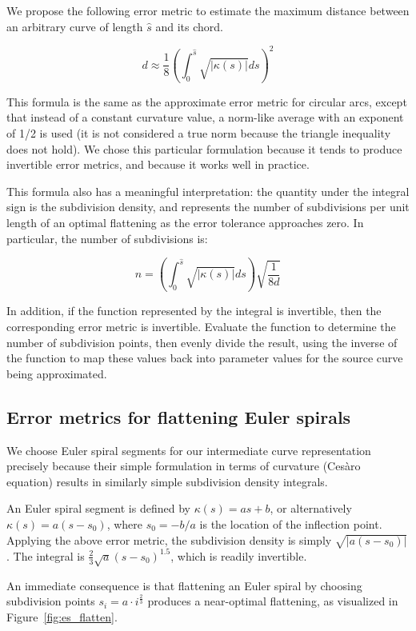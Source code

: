 \documentclass[sigconf, authordraft]{acmart}
\begin{document}
We propose the following error metric to estimate the maximum distance between an arbitrary curve of length $\hat{s}$ and its chord. 

\[
    d \approx \frac{1}{8}\left(\int_0^{\hat{s}} \sqrt{|\kappa(s)|}ds \right)^2
\]


This formula is the same as the approximate error metric for circular arcs, except that instead of a constant curvature value, a norm-like average with an exponent of 1/2 is used (it is not considered a true norm because the triangle inequality does not hold). We chose this particular formulation because it tends to produce invertible error metrics, and because it works well in practice.

This formula also has a meaningful interpretation: the quantity under the integral sign is the subdivision density, and represents the number of subdivisions per unit length of an optimal flattening as the error tolerance approaches zero. In particular, the number of subdivisions is:

\[
    n = \left(\int_0^{\hat{s}} \sqrt{|\kappa(s)|}ds \right)\sqrt{\frac{1}{8d}}
\]

In addition, if the function represented by the integral is invertible, then the corresponding error metric is invertible. Evaluate the function to determine the number of subdivision points, then evenly divide the result, using the inverse of the function to map these values back into parameter values for the source curve being approximated.

\subsection{Error metrics for flattening Euler spirals}

We choose Euler spiral segments for our intermediate curve representation precisely because their simple formulation in terms of curvature (Cesàro equation) results in similarly simple subdivision density integrals.

An Euler spiral segment is defined by $\kappa(s) = as+b$, or alternatively $\kappa(s) = a(s-s_0)$, where $s_0 = -b/a$ is the location of the inflection point. Applying the above error metric, the subdivision density is simply $\sqrt{|a(s-s_0)|}$. The integral is $\frac{2}{3}\sqrt{a}(s-s_0)^{1.5}$, which is readily invertible.

An immediate consequence is that flattening an Euler spiral by choosing subdivision points $s_i = a\cdot i^\frac{2}{3}$ produces a near-optimal flattening, as visualized in Figure~\ref{fig:es_flatten}.
\end{document}
